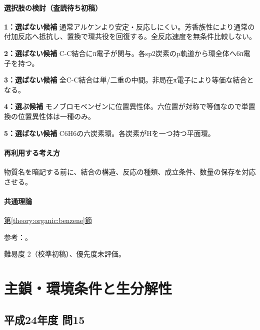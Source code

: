\paragraph{選択肢の検討（査読待ち初稿）}\mbox{}\par

\noindent\textbf{1：選ばない候補} 通常アルケンより安定・反応しにくい。芳香族性により通常の付加反応へ抵抗し、置換で環共役を回復する。全反応速度を無条件比較しない。\par

\noindent\textbf{2：選ばない候補} C-C結合にπ電子が関与。各sp2炭素のp軌道から環全体へ6π電子を持つ。\par

\noindent\textbf{3：選ばない候補} 全C-C結合は単/二重の中間。非局在π電子により等価な結合となる。\par

\noindent\textbf{4：選ぶ候補} モノブロモベンゼンに位置異性体。六位置が対称で等価なので単置換の位置異性体は一種のみ。\par

\noindent\textbf{5：選ばない候補} C6H6の六炭素環。各炭素がHを一つ持つ平面環。\par

\paragraph{再利用する考え方} 物質名を暗記する前に、結合の構造、反応の種類、成立条件、数量の保存を対応させる。

\paragraph{共通理論} \hyperref[theory:organic:benzene]{第\ref*{theory:organic:benzene}節}

\par 参考：\cite{organic_benzene}。

\par 難易度 2（校準初稿）、優先度未評価。

\section{主鎖・環境条件と生分解性}

\subsection{平成24年度 問15}
\label{q:h24-reg-applied-15}

